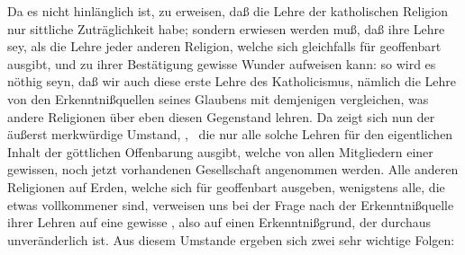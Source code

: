 Da es nicht hinlänglich ist, zu erweisen, daß die Lehre der katholischen Religion nur  sittliche Zuträglichkeit habe; sondern erwiesen werden muß, daß ihre Lehre  sey, als die Lehre jeder anderen Religion, welche sich gleichfalls für geoffenbart ausgibt, und zu ihrer Bestätigung gewisse Wunder aufweisen kann: so wird es nöthig seyn, daß wir auch diese erste Lehre des Katholicismus, nämlich die Lehre von den Erkenntnißquellen seines Glaubens mit demjenigen vergleichen, was andere Religionen über eben diesen Gegenstand lehren. Da zeigt sich nun der äußerst merkwürdige Umstand, , \dh\ die nur alle solche Lehren für den eigentlichen Inhalt der göttlichen Offenbarung ausgibt, welche von allen Mitgliedern einer gewissen, noch jetzt vorhandenen Gesellschaft angenommen werden. Alle anderen Religionen auf Erden, welche sich für geoffenbart ausgeben, wenigstens alle, die etwas vollkommener sind, verweisen uns bei der Frage nach der Erkenntnißquelle ihrer Lehren auf eine gewisse , also auf einen Erkenntnißgrund, der durchaus unveränderlich ist. Aus diesem Umstande ergeben sich zwei sehr wichtige Folgen:
